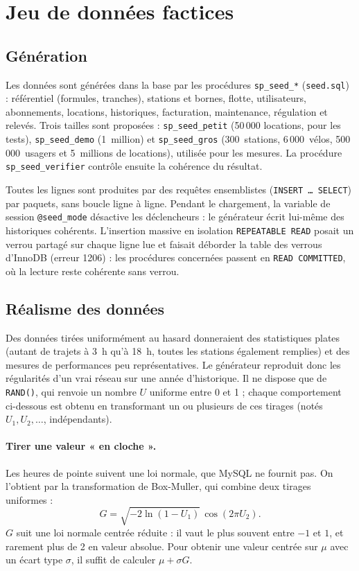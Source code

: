 \section{Jeu de données factices}\label{sec:donnees}

\subsection{Génération}

Les données sont générées dans la base par les procédures \texttt{sp\_seed\_*} (\texttt{seed.sql}) : référentiel (formules, tranches), stations et bornes, flotte, utilisateurs, abonnements, locations, historiques, facturation, maintenance, régulation et relevés. Trois tailles sont proposées : \texttt{sp\_seed\_petit} (50\,000 locations, pour les tests), \texttt{sp\_seed\_demo} (1~million) et \texttt{sp\_seed\_gros} (300~stations, 6\,000~vélos, 500\,000~usagers et 5~millions de locations), utilisée pour les mesures. La procédure \texttt{sp\_seed\_verifier} contrôle ensuite la cohérence du résultat.

Toutes les lignes sont produites par des requêtes ensemblistes (\texttt{INSERT \ldots{} SELECT}) par paquets, sans boucle ligne à ligne. Pendant le chargement, la variable de session \texttt{@seed\_mode} désactive les déclencheurs : le générateur écrit lui-même des historiques cohérents. L'insertion massive en isolation \texttt{REPEATABLE READ} posait un verrou partagé sur chaque ligne lue et faisait déborder la table des verrous d'InnoDB (erreur 1206) : les procédures concernées passent en \texttt{READ COMMITTED}, où la lecture reste cohérente sans verrou.

\subsection{Réalisme des données}

Des données tirées uniformément au hasard donneraient des statistiques plates (autant de trajets à 3~h qu'à 18~h, toutes les stations également remplies) et des mesures de performances peu représentatives. Le générateur reproduit donc les régularités d'un vrai réseau sur une année d'historique. Il ne dispose que de \texttt{RAND()}, qui renvoie un nombre $U$ uniforme entre 0 et 1 ; chaque comportement ci-dessous est obtenu en transformant un ou plusieurs de ces tirages (notés $U_1, U_2, \ldots$, indépendants).

\paragraph{Tirer une valeur « en cloche ».} Les heures de pointe suivent une loi normale, que MySQL ne fournit pas. On l'obtient par la transformation de Box-Muller, qui combine deux tirages uniformes :
\[
	G = \sqrt{-2\ln(1-U_1)}\,\cos(2\pi U_2).
\]
$G$ suit une loi normale centrée réduite : il vaut le plus souvent entre $-1$ et $1$, et rarement plus de 2 en valeur absolue. Pour obtenir une valeur centrée sur $\mu$ avec un écart type $\sigma$, il suffit de calculer $\mu + \sigma G$.

